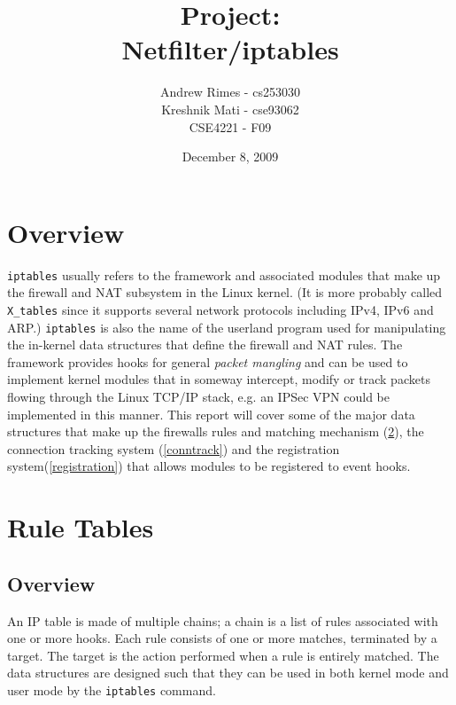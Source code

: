 \documentclass[a4paper,10pt]{article}
\begin{document}
\title{\textbf{Project}:\\Netfilter/iptables}
\author{Andrew Rimes - cs253030\\Kreshnik Mati - cse93062\\CSE4221 - F09}
\date{December 8, 2009}

\maketitle
\thispagestyle{empty} 

\newpage

\setcounter{tocdepth}{3}
\tableofcontents


\newpage
\raggedright

\section{Overview}

\verb|iptables| usually refers to the framework and associated modules that make up the firewall and NAT subsystem in the Linux kernel. (It is more probably called \verb|X_tables| since it supports several network protocols including IPv4, IPv6 and ARP.) \verb|iptables| is also the name of the userland program used for manipulating the in-kernel data structures that define the firewall and NAT rules. The framework provides hooks for general \textit{packet mangling} and can be used to implement kernel modules that in someway intercept, modify or track packets flowing through the Linux TCP/IP stack, e.g. an IPSec VPN could be implemented in this manner. This report will cover some of the major data structures that make up the firewalls rules and matching mechanism (\ref{rule-tables}), the connection tracking system (\ref{conntrack}) and the registration system(\ref{registration}) that allows modules to be registered to event hooks.


\section{Rule Tables}\label{rule-tables}

\subsection{Overview}

An IP table is made of multiple chains; a chain is a list of rules
associated with one or more hooks. Each rule consists of one or more
matches, terminated by a target. The target is the action performed
when a rule is entirely matched. The data structures are designed
such that they can be used in both kernel mode and user mode by
the \verb|iptables| command.
\end{document}
